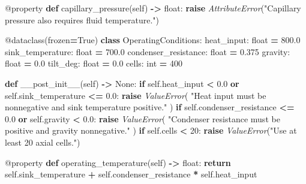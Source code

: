 \documentclass[
  12pt,a4paper,oneside]{report}
\newenvironment{Shaded}{\begin{snugshade}}{\end{snugshade}}
\newcommand{\AttributeTok}[1]{\textcolor[rgb]{0.77,0.63,0.00}{#1}}
\newcommand{\BuiltInTok}[1]{#1}
\newcommand{\ControlFlowTok}[1]{\textcolor[rgb]{0.13,0.29,0.53}{\textbf{#1}}}
\newcommand{\DecValTok}[1]{\textcolor[rgb]{0.00,0.00,0.81}{#1}}
\newcommand{\FloatTok}[1]{\textcolor[rgb]{0.00,0.00,0.81}{#1}}
\newcommand{\KeywordTok}[1]{\textcolor[rgb]{0.13,0.29,0.53}{\textbf{#1}}}
\newcommand{\NormalTok}[1]{#1}
\newcommand{\OperatorTok}[1]{\textcolor[rgb]{0.81,0.36,0.00}{\textbf{#1}}}
\newcommand{\PreprocessorTok}[1]{\textcolor[rgb]{0.56,0.35,0.01}{\textit{#1}}}
\newcommand{\StringTok}[1]{\textcolor[rgb]{0.31,0.60,0.02}{#1}}
\newcommand{\VariableTok}[1]{\textcolor[rgb]{0.00,0.00,0.00}{#1}}
\begin{document}
\begin{Shaded}
\begin{Highlighting}[]
    \AttributeTok{@property}
    \KeywordTok{def}\NormalTok{ capillary\_pressure(}\VariableTok{self}\NormalTok{) }\OperatorTok{{-}\textgreater{}} \BuiltInTok{float}\NormalTok{:}
        \ControlFlowTok{raise} \PreprocessorTok{AttributeError}\NormalTok{(}\StringTok{"Capillary pressure also requires fluid temperature."}\NormalTok{)}


\AttributeTok{@dataclass}\NormalTok{(frozen}\OperatorTok{=}\VariableTok{True}\NormalTok{)}
\KeywordTok{class}\NormalTok{ OperatingConditions:}
\NormalTok{    heat\_input: }\BuiltInTok{float} \OperatorTok{=} \FloatTok{800.0}
\NormalTok{    sink\_temperature: }\BuiltInTok{float} \OperatorTok{=} \FloatTok{700.0}
\NormalTok{    condenser\_resistance: }\BuiltInTok{float} \OperatorTok{=} \FloatTok{0.375}
\NormalTok{    gravity: }\BuiltInTok{float} \OperatorTok{=} \FloatTok{0.0}
\NormalTok{    tilt\_deg: }\BuiltInTok{float} \OperatorTok{=} \FloatTok{0.0}
\NormalTok{    cells: }\BuiltInTok{int} \OperatorTok{=} \DecValTok{400}

    \KeywordTok{def}\NormalTok{ \_\_post\_init\_\_(}\VariableTok{self}\NormalTok{) }\OperatorTok{{-}\textgreater{}} \VariableTok{None}\NormalTok{:}
        \ControlFlowTok{if} \VariableTok{self}\NormalTok{.heat\_input }\OperatorTok{\textless{}} \FloatTok{0.0} \KeywordTok{or} \VariableTok{self}\NormalTok{.sink\_temperature }\OperatorTok{\textless{}=} \FloatTok{0.0}\NormalTok{:}
            \ControlFlowTok{raise} \PreprocessorTok{ValueError}\NormalTok{(}
                \StringTok{"Heat input must be nonnegative and sink temperature positive."}
\NormalTok{            )}
        \ControlFlowTok{if} \VariableTok{self}\NormalTok{.condenser\_resistance }\OperatorTok{\textless{}=} \FloatTok{0.0} \KeywordTok{or} \VariableTok{self}\NormalTok{.gravity }\OperatorTok{\textless{}} \FloatTok{0.0}\NormalTok{:}
            \ControlFlowTok{raise} \PreprocessorTok{ValueError}\NormalTok{(}
                \StringTok{"Condenser resistance must be positive and gravity nonnegative."}
\NormalTok{            )}
        \ControlFlowTok{if} \VariableTok{self}\NormalTok{.cells }\OperatorTok{\textless{}} \DecValTok{20}\NormalTok{:}
            \ControlFlowTok{raise} \PreprocessorTok{ValueError}\NormalTok{(}\StringTok{"Use at least 20 axial cells."}\NormalTok{)}

    \AttributeTok{@property}
    \KeywordTok{def}\NormalTok{ operating\_temperature(}\VariableTok{self}\NormalTok{) }\OperatorTok{{-}\textgreater{}} \BuiltInTok{float}\NormalTok{:}
        \ControlFlowTok{return} \VariableTok{self}\NormalTok{.sink\_temperature }\OperatorTok{+} \VariableTok{self}\NormalTok{.condenser\_resistance }\OperatorTok{*} \VariableTok{self}\NormalTok{.heat\_input}



\end{Highlighting}
\end{Shaded}
\end{document}
